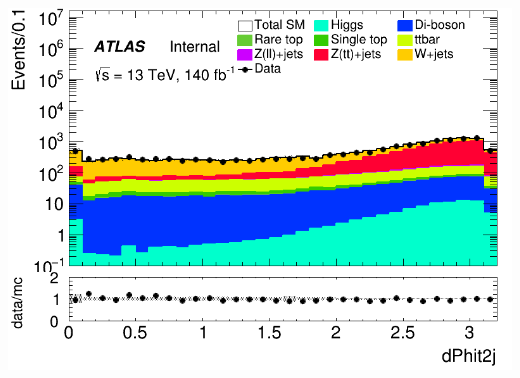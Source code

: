 \documentclass[usenames,dvipsnames]{beamer}
\begin{document}
\begin{frame}
\begin{minipage}{0.32\textwidth}
        \includegraphics[width=\textwidth]{graphics/HH_met/HH_met_dPhit2j.png}
    \end{minipage}
    
    \vspace{0.5cm} %


\end{frame}
\end{document}
